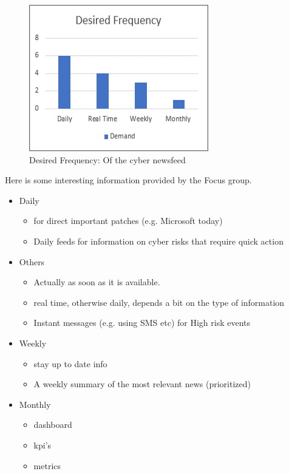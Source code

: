 \begin{figure}[ht]
    \centering
    \includegraphics[scale=0.6]{Figures/product-frequency.png}
    \caption{Desired Frequency: Of the cyber newsfeed}
    \label{fig:product-frequency}
\end{figure}
 \FloatBarrier
Here is some interesting information provided by the Focus group.

\begin{itemize}
    \item Daily
        \begin{itemize}
            \item for direct important patches (e.g. Microsoft today)
            \item Daily feeds for information on cyber risks that require quick action
        \end{itemize}
    \item Others
        \begin{itemize}
            \item Actually as soon as it is available.
            \item real time, otherwise daily, depends a bit on the type of information
            \item Instant messages (e.g. using SMS etc) for High risk events
        \end{itemize}
    \item Weekly
        \begin{itemize}
            \item stay up to date info
            \item A weekly summary of the most relevant news (prioritized)
        \end{itemize}
    \item Monthly
        \begin{itemize}
            \item dashboard
            \item kpi's
            \item metrics
        \end{itemize}
\end{itemize}



